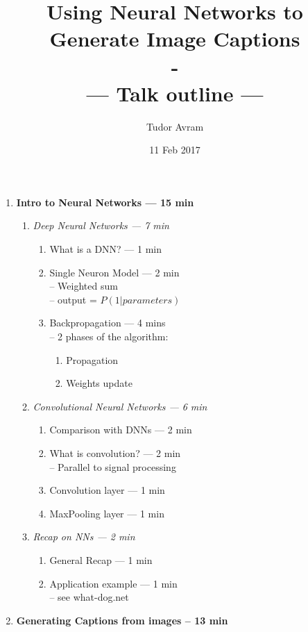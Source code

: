 \documentclass{article}
\author{Tudor Avram}
\date{11 Feb 2017}
\title{Using Neural Networks to Generate Image Captions \\ - \\ --- Talk outline --- }
\begin{document}
	\maketitle
	\begin{enumerate}
		\item \textbf{Intro to Neural Networks --- 15 min} 
			\begin{enumerate}
				\item \textit{Deep Neural Networks --- 7 min}	
					\begin{enumerate}
						\item What is a DNN?  --- 1 min
						\item Single Neuron Model --- 2 min \\ 
									-- Weighted sum \\
									-- output  = $P(1|parameters)$
						\item Backpropagation --- 4 mins \\
									-- 2 phases of the algorithm: 
									\begin{enumerate}
										\item Propagation
										\item Weights update
									\end{enumerate}
					\end{enumerate}
				\item \textit{Convolutional Neural Networks --- 6 min}
					\begin{enumerate}
						\item Comparison with DNNs --- 2 min
						\item What is convolution?    --- 2 min \\
								-- Parallel to signal processing
						\item Convolution layer			--- 1 min
						\item MaxPooling layer 			--- 1 min
					\end{enumerate}
				\item \textit{Recap on NNs --- 2 min}
					\begin{enumerate}
						\item General Recap --- 1 min
						\item Application example --- 1 min \\
								-- see what-dog.net
					\end{enumerate}  
			\end{enumerate}
		\item \textbf{Generating Captions from images -- 13 min} 
			\begin{enumerate}

\end{enumerate}
\end{enumerate}
\end{document}
